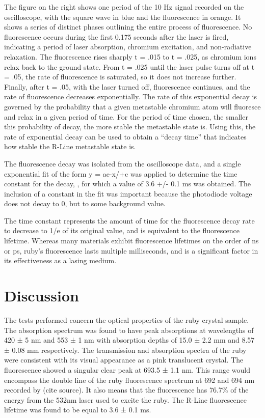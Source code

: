 \documentclass[11pt, a4paper, twocolumn]{article}
\begin{document}
The figure on the right shows one period of the 10 Hz signal recorded on the oscilloscope, with the square wave in blue and the fluorescence in orange. It shows a series of distinct phases outlining the entire process of fluorescence. No fluorescence occurs during the first 0.175 seconds after the laser is fired, indicating a period of laser absorption, chromium excitation, and non-radiative relaxation. The fluorescence rises sharply t = .015 to t = .025, as chromium ions relax back to the ground state. From t = .025 until the laser pulse turns off at t = .05, the rate of fluorescence is saturated, so it does not increase further. Finally, after t = .05, with the laser turned off, fluorescence continues, and the rate of fluorescence decreases exponentially. 
The rate of this exponential decay is governed by the probability that a given metastable chromium atom will fluoresce and relax in a given period of time. For the period of time chosen, the smaller this probability of decay, the more stable the metastable state is. Using this, the rate of exponential decay can be used to obtain a “decay time” that indicates how stable the R-Line metastable state is.

The fluorescence decay was isolated from the oscilloscope data, and a single exponential fit of the form y = ae-x/+c was applied to determine the time constant for the decay, , for which a value of 3.6 +/- 0.1 ms was obtained. The inclusion of a constant in the fit was important because the photodiode voltage does not decay to 0, but to some background value.

The time constant represents the amount of time for the fluorescence decay rate to decrease to 1/e of its original value, and is equivalent to the fluorescence lifetime. Whereas many materials exhibit fluorescence lifetimes on the order of ns or ps, ruby’s fluorescence lasts multiple milliseconds, and is a significant factor in its effectiveness as a lasing medium.

\section*{Discussion}
The tests performed concern the optical properties of the ruby crystal sample. The absorption spectrum was found to have peak absorptions at wavelengths of 420 ± 5 nm and 553 ± 1 nm with absorption depths of 15.0 ± 2.2 mm and 8.57 ± 0.08 mm respectively. The transmission and absorption spectra of the ruby were consistent with its visual appearance as a pink translucent crystal. The fluorescence showed a singular clear peak at 693.5 ± 1.1 nm. This range would encompass the double line of the ruby fluorescence spectrum at 692 and 694 nm recorded by (cite source). It also means that the fluorescence has 76.7\% of the energy from the 532nm laser used to excite the ruby. The R-Line fluorescence lifetime was found to be equal to 3.6 ± 0.1 ms.
\end{document}
